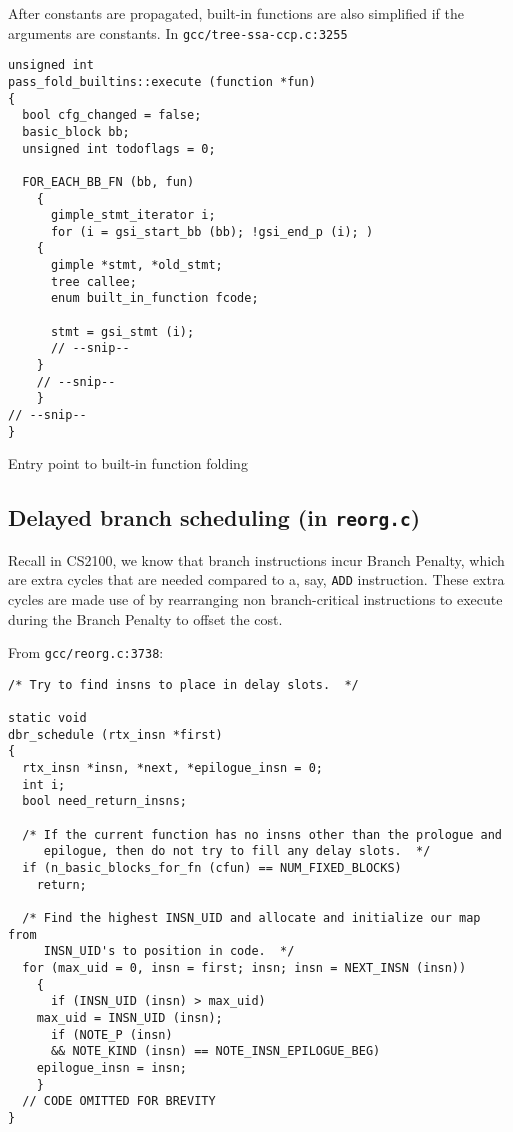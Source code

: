 \documentclass[11pt]{article}
\begin{document}
After constants are propagated, built-in functions are also simplified if the
arguments are constants. In \texttt{gcc/tree-ssa-ccp.c:3255}

\begin{listing}[H]
\begin{verbatim}
unsigned int
pass_fold_builtins::execute (function *fun)
{
  bool cfg_changed = false;
  basic_block bb;
  unsigned int todoflags = 0;

  FOR_EACH_BB_FN (bb, fun)
    {
      gimple_stmt_iterator i;
      for (i = gsi_start_bb (bb); !gsi_end_p (i); )
	{
	  gimple *stmt, *old_stmt;
	  tree callee;
	  enum built_in_function fcode;

	  stmt = gsi_stmt (i);
      // --snip--
    }
    // --snip--
    }
// --snip--
}
\end{verbatim}
\caption{Entry point to built-in function folding}
\end{listing}
\subsection{Delayed branch scheduling (in \texttt{reorg.c})}
\label{sec:orgb52a035}
Recall in CS2100, we know that branch instructions incur Branch Penalty, which
are extra cycles that are needed compared to a, say, \texttt{ADD} instruction. These
extra cycles are made use of by rearranging non branch-critical instructions to
execute during the Branch Penalty to offset the cost.

From \texttt{gcc/reorg.c:3738}:
\begin{verbatim}
/* Try to find insns to place in delay slots.  */

static void
dbr_schedule (rtx_insn *first)
{
  rtx_insn *insn, *next, *epilogue_insn = 0;
  int i;
  bool need_return_insns;

  /* If the current function has no insns other than the prologue and
     epilogue, then do not try to fill any delay slots.  */
  if (n_basic_blocks_for_fn (cfun) == NUM_FIXED_BLOCKS)
    return;

  /* Find the highest INSN_UID and allocate and initialize our map from
     INSN_UID's to position in code.  */
  for (max_uid = 0, insn = first; insn; insn = NEXT_INSN (insn))
    {
      if (INSN_UID (insn) > max_uid)
	max_uid = INSN_UID (insn);
      if (NOTE_P (insn)
	  && NOTE_KIND (insn) == NOTE_INSN_EPILOGUE_BEG)
	epilogue_insn = insn;
    }
  // CODE OMITTED FOR BREVITY
}
\end{verbatim}



\end{document}

